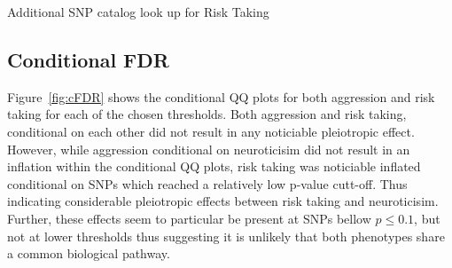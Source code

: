 \begin{table}[!htpb]
	\centering
	\resizebox{\textwidth}{!}{}
	\caption{Additional SNP catalog look up for Risk Taking}\label{tab:gwas_risk_catalog}
\end{table}

\subsection{Conditional FDR}
\label{sub:conditional_fdr}

Figure~\ref{fig:cFDR} shows the conditional QQ plots for both aggression and risk taking for each of the chosen thresholds.
Both aggression and risk taking, conditional on each other did not result in any noticiable pleiotropic effect.
However, while aggression conditional on neuroticisim did not result in an inflation within the conditional QQ plots, risk taking was noticiable inflated conditional on SNPs which reached a relatively low p-value cutt-off.
Thus indicating considerable pleiotropic effects between risk taking and neuroticisim.
Further, these effects seem to particular be present at SNPs bellow $p\leq0.1$, but not at lower thresholds thus suggesting it is unlikely that both phenotypes share a common biological pathway.

